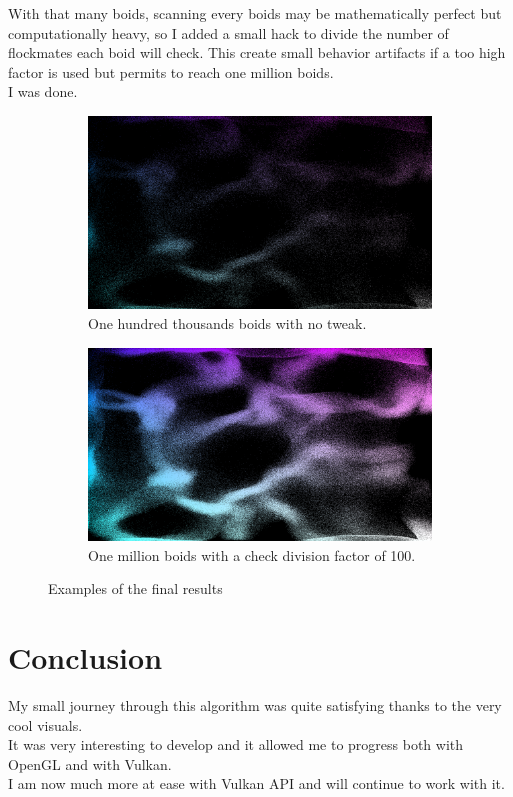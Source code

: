 \documentclass{article}
\begin{document}
With that many boids, scanning every boids may be mathematically perfect but computationally heavy, so I added a small hack to divide the number of flockmates each boid will check. This create small behavior artifacts if a too high factor is used but permits to reach one million boids.\\
I was done.
\begin{figure}[H]
    \centering
    \begin{subfigure}[H]{\textwidth}
        \centering
        \includegraphics[width=.9\linewidth]{100000.png}
        \caption{One hundred thousands boids with no tweak.}
    \end{subfigure}
    \begin{subfigure}[H]{\textwidth}
        \centering
        \includegraphics[width=.9\linewidth]{1000000.png}
        \caption{One million boids with a check division factor of 100.}
    \end{subfigure}
    \caption{Examples of the final results}
\end{figure}

\newpage
\section{Conclusion}
My small journey through this algorithm was quite satisfying thanks to the very cool visuals.\\
It was very interesting to develop and it allowed me to progress both with OpenGL and with Vulkan.\\
I am now much more at ease with Vulkan API and will continue to work with it.\\
\end{document}
